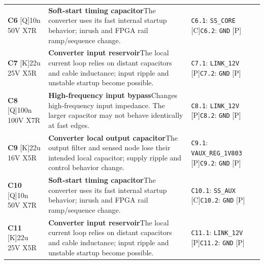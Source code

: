 \documentclass[11pt,a4paper]{article}
\begin{document}
\begin{longtable}{@{}P{27mm}P{77mm}P{62mm}@{}}
\textbf{C6} [Q]\newline 10n 50V X7R & \textbf{Soft-start timing capacitor}\newline The converter uses its fast internal startup behavior; inrush and FPGA rail ramp/sequence change. & \nolinkurl{C6.1}: \nolinkurl{SS_CORE} [C]\newline \nolinkurl{C6.2}: \nolinkurl{GND} [P] \\
\textbf{C7} [K]\newline 22u 25V X5R & \textbf{Converter input reservoir}\newline The local current loop relies on distant capacitors and cable inductance; input ripple and unstable startup become possible. & \nolinkurl{C7.1}: \nolinkurl{LINK_12V} [P]\newline \nolinkurl{C7.2}: \nolinkurl{GND} [P] \\
\textbf{C8} [Q]\newline 100n 100V X7R & \textbf{High-frequency input bypass}\newline Changes high-frequency input impedance. The larger capacitor may not behave identically at fast edges. & \nolinkurl{C8.1}: \nolinkurl{LINK_12V} [P]\newline \nolinkurl{C8.2}: \nolinkurl{GND} [P] \\
\textbf{C9} [K]\newline 22u 16V X5R & \textbf{Converter local output capacitor}\newline The output filter and sensed node lose their intended local capacitor; supply ripple and control behavior change. & \nolinkurl{C9.1}: \nolinkurl{VAUX_REG_1V803} [P]\newline \nolinkurl{C9.2}: \nolinkurl{GND} [P] \\
\textbf{C10} [Q]\newline 10n 50V X7R & \textbf{Soft-start timing capacitor}\newline The converter uses its fast internal startup behavior; inrush and FPGA rail ramp/sequence change. & \nolinkurl{C10.1}: \nolinkurl{SS_AUX} [C]\newline \nolinkurl{C10.2}: \nolinkurl{GND} [P] \\
\textbf{C11} [K]\newline 22u 25V X5R & \textbf{Converter input reservoir}\newline The local current loop relies on distant capacitors and cable inductance; input ripple and unstable startup become possible. & \nolinkurl{C11.1}: \nolinkurl{LINK_12V} [P]\newline \nolinkurl{C11.2}: \nolinkurl{GND} [P] \\

\end{longtable}
\end{document}
